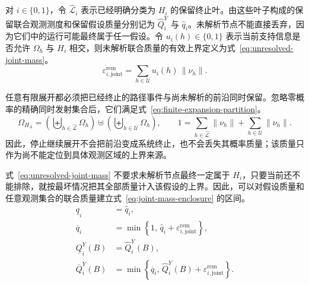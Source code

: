 \documentclass[master,fontset=ubuntu]{shnuthesis}
\theoremstyle{definition}
\begin{document}
对 \(i\in\{0,1\}\)，令 \(\widehat{\mathcal L}_i\) 表示已经明确分类为 \(H_i\) 的保留终止叶。由这些叶子构成的保留联合观测测度和保留假设质量分别记为 \(\widehat Q_i^Y\) 与 \(\widehat q_i\)。未解析节点不能直接丢弃，因为它们中的运行可能最终属于任一假设。令 \(u_i(h)\in\{0,1\}\) 表示当前支持信息是否允许 \(\Omega_h\) 与 \(H_i\) 相交，则未解析联合质量的有效上界定义为式~\eqref{eq:unresolved-joint-mass}。
\begin{equation}
\varepsilon_{i,\mathrm{joint}}^{\mathrm{rem}}
=
\sum_{h\in\mathcal U}
u_i(h)\,
\|\nu_h\|.
\label{eq:unresolved-joint-mass}
\end{equation}

任意有限展开都必须把已经终止的路径事件与尚未解析的前沿同时保留。忽略零概率的精确同时发射集合后，它们满足式~\eqref{eq:finite-expansion-partition}。
\begin{equation}
\Omega_{H_A}
=
\left(\biguplus_{h\in\widehat{\mathcal L}}\Omega_h\right)
\uplus
\left(\biguplus_{h\in\mathcal U}\Omega_h\right),
\qquad
1=
\sum_{h\in\widehat{\mathcal L}}\|\nu_h\|
+
\sum_{h\in\mathcal U}\|\nu_h\|.
\label{eq:finite-expansion-partition}
\end{equation}
因此，停止继续展开不会把前沿变成系统终止，也不会丢失其概率质量；该质量只作为尚不能定位到具体观测区域的上界来源。

式~\eqref{eq:unresolved-joint-mass} 不要求未解析节点最终一定属于 \(H_i\)，只要当前还不能排除，就按最坏情况把其全部质量计入该假设的上界。因此，可以对假设质量和任意观测集合的联合质量建立式~\eqref{eq:joint-mass-enclosure} 的区间。
\begin{equation}
\begin{aligned}
\underline q_i
&=
\widehat q_i,\\
\overline q_i
&=
\min\!\left\{
1,\,
\widehat q_i+
\varepsilon_{i,\mathrm{joint}}^{\mathrm{rem}}
\right\},\\
\underline Q_i^Y(B)
&=
\widehat Q_i^Y(B),\\
\overline Q_i^Y(B)
&=
\min\!\left\{
\overline q_i,\,
\widehat Q_i^Y(B)+
\varepsilon_{i,\mathrm{joint}}^{\mathrm{rem}}
\right\}.
\end{aligned}
\label{eq:joint-mass-enclosure}
\end{equation}
\end{document}
